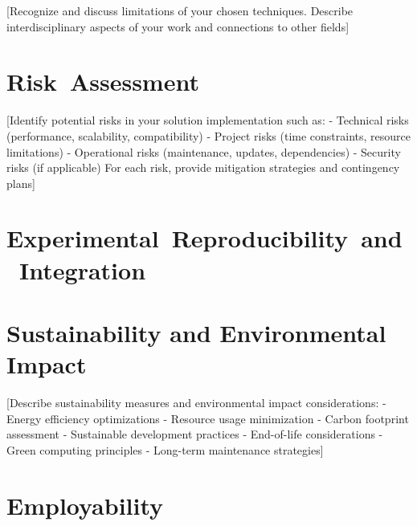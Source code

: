 \documentclass[11pt,a4paper,oneside]{book}
\begin{document}
[Recognize and discuss limitations of your chosen techniques. Describe interdisciplinary aspects of your work and connections to other fields]

\section{Risk~Assessment}

[Identify potential risks in your solution implementation such as:
- Technical risks (performance, scalability, compatibility)
- Project risks (time constraints, resource limitations)
- Operational risks (maintenance, updates, dependencies)
- Security risks (if applicable)
For each risk, provide mitigation strategies and contingency plans]

\section{Experimental~Reproducibility~and~Integration}


\section{Sustainability and Environmental Impact}

[Describe sustainability measures and environmental impact considerations:
- Energy efficiency optimizations
- Resource usage minimization
- Carbon footprint assessment
- Sustainable development practices
- End-of-life considerations
- Green computing principles
- Long-term maintenance strategies]

\section{Employability}
\end{document}
